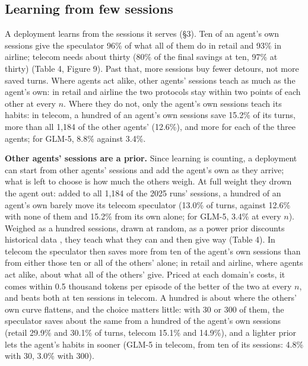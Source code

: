 \documentclass[10pt,twocolumn,letterpaper]{article}
\newcommand{\runin}[1]{{\sffamily\bfseries\color{accent}#1}}
\begin{document}
\subsection{Learning from few sessions}\label{learning-from-few-sessions}

A deployment learns from the sessions it serves (§3). Ten of an agent's own sessions give the speculator 96\% of what all of them do in retail and 93\% in airline; telecom needs about thirty (80\% of the final savings at ten, 97\% at thirty) (Table 4, Figure 9). Past that, more sessions buy fewer detours, not more saved turns. Where agents act alike, other agents' sessions teach as much as the agent's own: in retail and airline the two protocols stay within two points of each other at every \(n\). Where they do not, only the agent's own sessions teach its habits: in telecom, a hundred of an agent's own sessions save 15.2\% of its turns, more than all 1,184 of the other agents' (12.6\%), and more for each of the three agents; for GLM-5, 8.8\% against 3.4\%.

\runin{Other agents' sessions are a prior.} Since learning is counting, a deployment can start from other agents' sessions and add the agent's own as they arrive; what is left to choose is how much the others weigh. At full weight they drown the agent out: added to all 1,184 of the 2025 runs' sessions, a hundred of an agent's own barely move its telecom speculator (13.0\% of turns, against 12.6\% with none of them and 15.2\% from its own alone; for GLM-5, 3.4\% at every \(n\)). Weighed as a hundred sessions, drawn at random, as a power prior discounts historical data \citep{ibrahim2000power}, they teach what they can and then give way (Table 4). In telecom the speculator then saves more from ten of the agent's own sessions than from either those ten or all of the others' alone; in retail and airline, where agents act alike, about what all of the others' give. Priced at each domain's costs, it comes within 0.5 thousand tokens per episode of the better of the two at every \(n\), and beats both at ten sessions in telecom. A hundred is about where the others' own curve flattens, and the choice matters little: with 30 or 300 of them, the speculator saves about the same from a hundred of the agent's own sessions (retail 29.9\% and 30.1\% of turns, telecom 15.1\% and 14.9\%), and a lighter prior lets the agent's habits in sooner (GLM-5 in telecom, from ten of its sessions: 4.8\% with 30, 3.0\% with 300).
\end{document}
